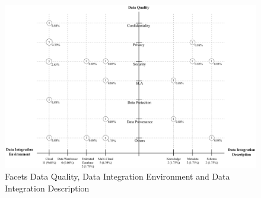 \begin{figure}[h!]
\centering
\includegraphics[scale=0.53]{figs/bubble-charts/Data-Quality-DI.pdf}
\caption{Facets Data Quality, Data Integration Environment and Data Integration Description}\label{fig:facet4}
\end{figure}
